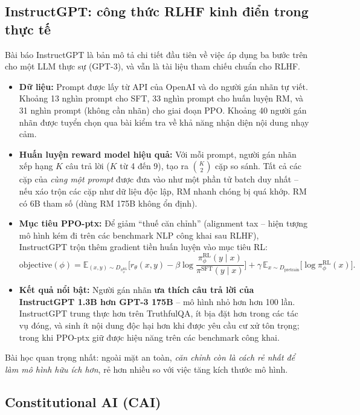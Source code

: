 \subsection{InstructGPT: công thức RLHF kinh điển trong thực tế}
\label{sssec:instructgpt}
Bài báo InstructGPT \cite{ouyang2022training} là bản mô tả chi tiết đầu tiên về việc áp dụng ba bước trên cho một LLM thực sự (GPT-3), và vẫn là tài liệu tham chiếu chuẩn cho RLHF.
\begin{itemize}
	\item \textbf{Dữ liệu:} Prompt được lấy từ API của OpenAI và do người gán nhãn tự viết. Khoảng 13 nghìn prompt cho SFT, 33 nghìn prompt cho huấn luyện RM, và 31 nghìn prompt (không cần nhãn) cho giai đoạn PPO. Khoảng 40 người gán nhãn được tuyển chọn qua bài kiểm tra về khả năng nhận diện nội dung nhạy cảm.
	\item \textbf{Huấn luyện reward model hiệu quả:} Với mỗi prompt, người gán nhãn xếp hạng $K$ câu trả lời ($K$ từ 4 đến 9), tạo ra $\binom{K}{2}$ cặp so sánh. Tất cả các cặp của \emph{cùng một prompt} được đưa vào như một phần tử batch duy nhất -- nếu xáo trộn các cặp như dữ liệu độc lập, RM nhanh chóng bị quá khớp. RM có 6B tham số (dùng RM 175B không ổn định).
	\item \textbf{Mục tiêu PPO-ptx:} Để giảm “thuế căn chỉnh” (alignment tax -- hiện tượng mô hình kém đi trên các benchmark NLP công khai sau RLHF), InstructGPT trộn thêm gradient tiền huấn luyện vào mục tiêu RL:
	\[
	\text{objective}(\phi) = \mathbb{E}_{(x,y)\sim D_{\pi_\phi^{\text{RL}}}}\Big[r_\theta(x,y) - \beta \log\frac{\pi_\phi^{\text{RL}}(y\mid x)}{\pi^{\text{SFT}}(y\mid x)}\Big] + \gamma\, \mathbb{E}_{x\sim D_{\text{pretrain}}}\Big[\log \pi_\phi^{\text{RL}}(x)\Big].
	\]
	\item \textbf{Kết quả nổi bật:} Người gán nhãn \textbf{ưa thích câu trả lời của InstructGPT 1.3B hơn GPT-3 175B} -- mô hình nhỏ hơn hơn 100 lần. InstructGPT trung thực hơn trên TruthfulQA, ít bịa đặt hơn trong các tác vụ đóng, và sinh ít nội dung độc hại hơn khi được yêu cầu cư xử tôn trọng; trong khi PPO-ptx giữ được hiệu năng trên các benchmark công khai.
\end{itemize}
Bài học quan trọng nhất: ngoài mặt an toàn, \emph{căn chỉnh còn là cách rẻ nhất để làm mô hình hữu ích hơn}, rẻ hơn nhiều so với việc tăng kích thước mô hình.

\subsection{Constitutional AI (CAI)}
\label{ssec:cai}

